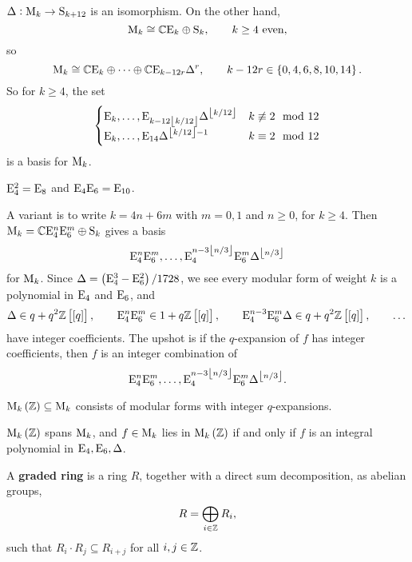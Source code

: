 \begin{corollary}
$ \Delta : \mathrm{M}_k \to \mathrm{S}_{k + 12} $ is an isomorphism. On the other hand,
$$ \mathrm{M}_k \cong \mathbb{C}\mathrm{E}_k \oplus \mathrm{S}_k, \qquad k \ge 4 \ \text{even}, $$
so
$$ \M_k \cong \CC\E_k \oplus \dots \oplus \CC\E_{k - 12r}\Delta^r, \qquad k - 12r \in \cbr{0, 4, 6, 8, 10, 14}. $$
So for $ k \ge 4 $, the set
$$
\begin{cases}
\mathrm{E}_k, \dots, \mathrm{E}_{k - 12\left\lfloor k / 12 \right\rfloor}\Delta^{\left\lfloor k / 12 \right\rfloor} & k \not\equiv 2 \mod 12 \\
\mathrm{E}_k, \dots, \mathrm{E}_{14}\Delta^{\left\lfloor k / 12 \right\rfloor - 1} & k \equiv 2 \mod 12
\end{cases}
$$
is a basis for $ \mathrm{M}_k $.
\end{corollary}

\begin{corollary}
$ \mathrm{E}_4^2 = \mathrm{E}_8 $ and $ \mathrm{E}_4\mathrm{E}_6 = \mathrm{E}_{10} $.
\end{corollary}


A variant is to write $ k = 4n + 6m $ with $ m = 0, 1 $ and $ n \ge 0 $, for $ k \ge 4 $. Then $ \mathrm{M}_k = \mathbb{C}\mathrm{E}_4^n\mathrm{E}_6^m \oplus \mathrm{S}_k $ gives a basis
$$ \mathrm{E}_4^n\mathrm{E}_6^m, \dots, \mathrm{E}_4^{n - 3\left\lfloor n / 3 \right\rfloor}\mathrm{E}_6^m\Delta^{\left\lfloor n / 3 \right\rfloor} $$
for $ \mathrm{M}_k $. Since $ \Delta = \br{\E_4^3 - \E_6^2} / 1728 $, we see every modular form of weight $ k $ is a polynomial in $ \mathrm{E}_4 $ and $ \mathrm{E}_6 $, and
$$ \Delta \in q + q^2\ZZ\sbr{\sbr{q}}, \qquad \E_4^n\E_6^m \in 1 + q\ZZ\sbr{\sbr{q}}, \qquad \E_4^{n - 3}\E_6^m\Delta \in q + q^2\ZZ\sbr{\sbr{q}}, \qquad \dots $$
have integer coefficients. The upshot is if the $ q $-expansion of $ f $ has integer coefficients, then $ f $ is an integer combination of
$$ \mathrm{E}_4^n\mathrm{E}_6^m, \dots, \mathrm{E}_4^{n - 3\left\lfloor n / 3 \right\rfloor}\mathrm{E}_6^m\Delta^{\left\lfloor n / 3 \right\rfloor}. $$

\begin{notation*}
$ \M_k\br{\ZZ} \subseteq \M_k $ consists of modular forms with integer $ q $-expansions.
\end{notation*}

\begin{theorem}
$ \M_k\br{\ZZ} $ spans $ \mathrm{M}_k $, and $ f \in \mathrm{M}_k $ lies in $ \M_k\br{\ZZ} $ if and only if $ f $ is an integral polynomial in $ \mathrm{E}_4, \mathrm{E}_6, \Delta $.
\end{theorem}

\begin{definition}
A \textbf{graded ring} is a ring $ R $, together with a direct sum decomposition, as abelian groups,
$$ R = \bigoplus_{i \in \mathbb{Z}} R_i, $$
such that $ R_i \cdot R_j \subseteq R_{i + j} $ for all $ i, j \in \mathbb{Z} $.
\end{definition}

